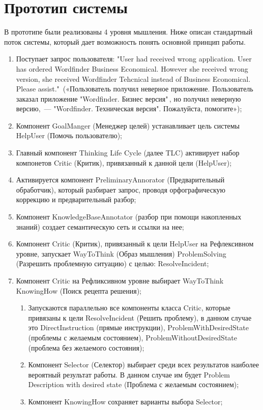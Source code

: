 \section{Прототип системы}
В прототипе были реализованы 4 уровня мышления. Ниже описан стандартный поток системы, который дает возможность понять основной принцип работы.
\begin{enumerate}
	\item Поступает запрос пользователя: 
	"User had received wrong application. User has ordered Wordfinder Business Economical. However she received wrong version, she received Wordfinder Tehcnical instead of Business Economical. Please assist."\ («Пользователь получил неверное приложение. Пользователь заказал приложение "Wordfinder. Бизнес версия"\,, но получил неверную версию,~--- "Wordfinder. Техническая версия". Пожалуйста, помогите»);
	\item Компонент GoalManger (Менеджер целей) устанавливает цель системы HelpUser (Помочь пользователю);
	\item Главный компонент Thinking Life Cycle (далее TLC) активирует набор компонетов Critic (Критик), привязанный к данной цели (HelpUser); 
	\item Активируется компонент PreliminaryAnnorator (Предварительный обработчик), который разбирает запрос, проводя орфографическую коррекцию и предварительный разбор;
	\item Компонент KnowledgeBaseAnnotator (разбор при помощи накопленных знаний) создает семантическую сеть и ссылки на нее;
	\item Компонент Critic (Критик), привязанный к цели HelpUser на Рефлексивном уровне, запускает WayToThink (Образ мышления) ProblemSolving (Разрешить проблемную ситуацию) с целью: ResolveIncident;
	\item Компонент Critic на Рефликсивном уровне выбирает WayToThink KnowingHow (Поиск рецепта решения);
	\begin{enumerate}
	\item Запускаются параллельно все компоненты класса Critic, которые привязаны к цели ResolveIncident (Решить проблему), в данном случае это DirectInstruction (прямые инструкции), ProblemWithDesiredState (проблемы с желаемым состоянием), ProblemWithoutDesiredState (проблема без желаемого состояния);
	\item Компонент Selector (Селектор) выбирает среди всех результатов наиболее вероятный результат работы. В данном случае им будет Problem Description with desired state (Проблема с желаемым состоянием);
	\item Компонент KnowingHow сохраняет варианты выбора Selector;

\end{enumerate}
\end{enumerate}
